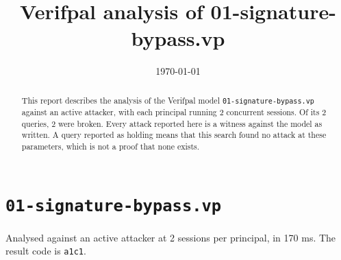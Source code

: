 \documentclass[11pt]{article}
\title{Verifpal analysis of 01-signature-bypass.vp}
\author{}
\date{\today}
\begin{document}
\maketitle

\begin{abstract}
\noindent This report describes the analysis of the Verifpal model \texttt{01-signature-bypass.vp} against an active attacker, with each principal running 2 concurrent sessions. Of its 2 queries, 2 were broken. Every attack reported here is a witness against the model as written. A query reported as holding means that this search found no attack at these parameters, which is not a proof that none exists.
\end{abstract}



\section{\texorpdfstring{\texttt{01-signature-bypass.vp}}{01-signature-bypass.vp}}
\label{sec:01-signature-bypass-vp-0}


\noindent Analysed against an active attacker at 2 sessions per principal, in 170 ms. The result code is \texttt{a1c1}.
\end{document}
